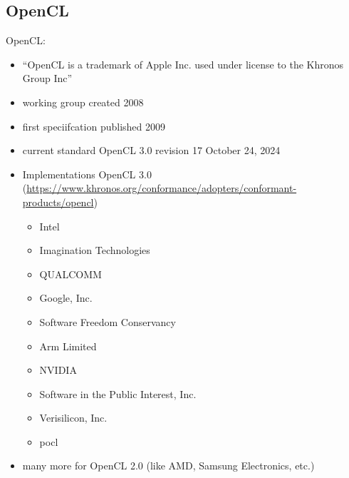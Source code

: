 \subsection{OpenCL}

OpenCL:
\begin{itemize}
    \item \enquote{OpenCL is a trademark of Apple Inc. used under license to the Khronos Group Inc}
    \item working group created 2008~\cite{khronos_opencl_working_group_khronos_2008}
    \item first speciifcation published 2009~\cite{munshi_opencl_2009}
    \item current standard OpenCL 3.0 revision 17 October 24, 2024~\cite{khronos_opencl_working_group_opencl_2024}
    \item Implementations OpenCL 3.0 (\url{https://www.khronos.org/conformance/adopters/conformant-products/opencl})
    \begin{itemize}
        \item Intel
        \item Imagination Technologies
        \item QUALCOMM
        \item Google, Inc. 
        \item Software Freedom Conservancy
        \item Arm Limited
        \item NVIDIA
        \item Software in the Public Interest, Inc.
        \item Verisilicon, Inc.
        \item pocl
    \end{itemize}
    \item many more for OpenCL 2.0 (like AMD, Samsung Electronics, etc.)
\end{itemize}